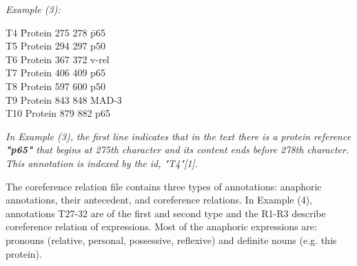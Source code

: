 \emph{Example (3):}
{\selectfont
	\begin{tabbing}
		\hspace{3cm} T4	\hspace{5mm}\=  Protein 275 278	\hspace{5mm} \= p65\\
		\hspace{3cm} T5 \> Protein 294 297 \> p50\\
		\hspace{3cm} T6	\> Protein 367 372 \> v-rel\\
		\hspace{3cm} T7	\> Protein 406 409 \> p65\\
		\hspace{3cm} T8	\> Protein 597 600 \> p50\\
		\hspace{3cm} T9	\> Protein 843 848 \> MAD-3\\
		\hspace{3cm} T10 \> Protein 879 882 \> p65\\
	\end{tabbing}
}
\vspace{5mm} 

\emph{In Example (3), the first line indicates that in the text there is a protein reference \textbf{"p65"} that begins at 275th character and its content ends before 278th character. This annotation is indexed by the id, "T4"[1].}

The coreference relation file contains three types of annotations: anaphoric annotations, their antecedent, and coreference relations. In Example (4), annotations T27-32 are of the first and second type and the R1-R3 describe coreference relation of expressions. Most of the anaphoric expressions are: pronouns (relative, personal, possessive, reflexive) and definite nouns (e.g. this protein).\\

